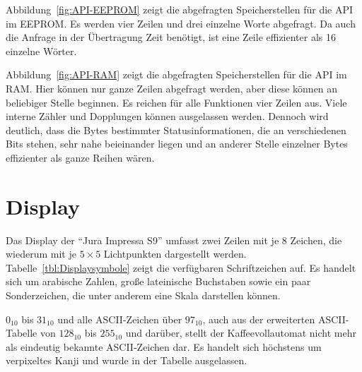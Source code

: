 Abbildung~\ref{fig:API-EEPROM} zeigt die abgefragten Speicherstellen für die \ac{API} im \ac{EEPROM}.
Es werden vier Zeilen und drei einzelne Worte abgefragt.
Da auch die Anfrage in der Übertragung Zeit benötigt, ist eine Zeile effizienter als 16 einzelne Wörter.

Abbildung~\ref{fig:API-RAM} zeigt die abgefragten Speicherstellen für die \ac{API} im \ac{RAM}.
Hier können nur ganze Zeilen abgefragt werden, aber diese können an beliebiger Stelle beginnen.
Es reichen für alle Funktionen vier Zeilen aus.
Viele interne Zähler und Dopplungen können ausgelassen werden.
Dennoch wird deutlich, dass die Bytes bestimmter Statusinformationen, die an verschiedenen Bits stehen, sehr nahe beieinander liegen und an anderer Stelle einzelner Bytes effizienter als ganze Reihen wären.

\section{Display}\label{sec:Display}
Das Display der "`Jura Impressa S9"' umfasst zwei Zeilen mit je 8 Zeichen, die wiederum mit je $5 \times 5$ Lichtpunkten dargestellt werden.
Tabelle~\ref{tbl:Displaysymbole} zeigt die verfügbaren Schriftzeichen auf.
Es handelt sich um arabische Zahlen, große lateinische Buchstaben sowie ein paar Sonderzeichen, die unter anderem eine Skala darstellen können.

$0_{10}$ bis $31_{10}$ und alle \ac{ASCII}-Zeichen über $97_{10}$, auch aus der erweiterten \ac{ASCII}-Tabelle von $128_{10}$ bis $255_{10}$ und darüber, stellt der Kaffeevollautomat nicht mehr als eindeutig bekannte \ac{ASCII}-Zeichen dar.
Es handelt sich höchstens um verpixeltes Kanji und wurde in der Tabelle ausgelassen.
